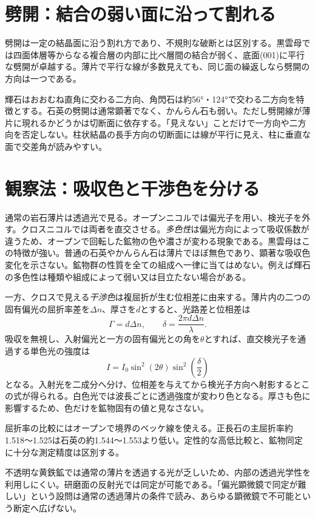 \section{劈開：結合の弱い面に沿って割れる}
\label{theory:mineral:cleavage}
劈開は一定の結晶面に沿う割れ方であり、不規則な破断とは区別する。黒雲母では四面体層等からなる複合層の内部に比べ層間の結合が弱く、底面(001)に平行な劈開が卓越する\parencite{hom_biotite}。薄片で平行な線が多数見えても、同じ面の繰返しなら劈開の方向は一つである。

輝石はおおむね直角に交わる二方向、角閃石は約56°・124°で交わる二方向を特徴とする。石英の劈開は通常顕著でなく、かんらん石も弱い\parencite{hom_augite,hom_quartz,hom_forsterite}。ただし劈開線が薄片に現れるかどうかは切断面に依存する。「見えない」ことだけで一方向や二方向を否定しない。柱状結晶の長手方向の切断面には線が平行に見え、柱に垂直な面で交差角が読みやすい。

\section{観察法：吸収色と干渉色を分ける}
\label{theory:mineral:observation}
通常の岩石薄片は透過光で見る。オープンニコルでは偏光子を用い、検光子を外す。クロスニコルでは両者を直交させる。\emph{多色性}は偏光方向によって吸収係数が違うため、オープンで回転した鉱物の色や濃さが変わる現象である。黒雲母はこの特徴が強い。普通の石英やかんらん石は薄片でほぼ無色であり、顕著な吸収色変化を示さない。鉱物群の性質を全ての組成へ一律に当てはめない。例えば輝石の多色性は種類や組成によって弱い又は目立たない場合がある\parencite{hom_biotite,hom_augite}。

一方、クロスで見える\emph{干渉色}は複屈折が生む位相差に由来する。薄片内の二つの固有偏光の屈折率差を$\Delta n$、厚さを$d$とすると、光路差と位相差は
\[
 \Gamma=d\Delta n,\qquad \delta=\frac{2\pi d\Delta n}{\lambda}.
\]
吸収を無視し、入射偏光と一方の固有偏光との角を$\theta$とすれば、直交検光子を通過する単色光の強度は
\[
 I=I_0\sin^2(2\theta)\sin^2\left(\frac{\delta}{2}\right)
\]
となる。入射光を二成分へ分け、位相差を与えてから検光子方向へ射影するとこの式が得られる。白色光では波長ごとに透過強度が変わり色となる。厚さも色に影響するため、色だけを鉱物固有の値と見なさない。

屈折率の比較にはオープンで境界のベッケ線を使える。正長石の主屈折率約1.518〜1.525は石英の約1.544〜1.553より低い\parencite{hom_orthoclase,hom_quartz}。定性的な高低比較と、鉱物同定に十分な測定精度は区別する。

不透明な黄鉄鉱では通常の薄片を透過する光が乏しいため、内部の透過光学性を利用しにくい\parencite{hom_pyrite}。研磨面の反射光では同定が可能である。「偏光顕微鏡で同定が難しい」という設問は通常の透過薄片の条件で読み、あらゆる顕微鏡で不可能という断定へ広げない。

